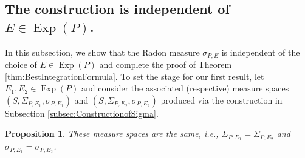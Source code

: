 \documentclass[11pt]{article}
\newtheorem{proposition}[theorem]{Proposition}
\theoremstyle{remark}
\newcommand\Exp{\operatorname{Exp}}
\begin{document}
\subsection{The construction is independent of $E\in\Exp(P)$.}\label{subsec:IndependentofE}

\noindent In this subsection, we show that the Radon measure $\sigma_{P,E}$ is independent of the choice of $E\in\Exp(P)$ and complete the proof of Theorem \ref{thm:BestIntegrationFormula}. To set the stage for our first result, let $E_1,E_2\in\Exp(P)$ and consider the associated (respective) measure spaces $(S,\Sigma_{P,E_1},\sigma_{P,E_1})$ and $(S,\Sigma_{P,E_2},\sigma_{P,E_2})$ produced via the construction in Subsection \ref{subsec:ConstructionofSigma}. 

\begin{proposition}\label{prop:Endependence}
These measure spaces are the same, i.e., $\Sigma_{P,E_1}=\Sigma_{P,E_2}$ and $\sigma_{P,E_1}=\sigma_{P,E_2}$.
\end{proposition}
\end{document}
